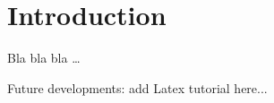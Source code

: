 \chapter{Introduction}
\label{sec:introduction}

Bla bla bla \dots

\vspace{5mm} %

Future developments: add Latex tutorial here...